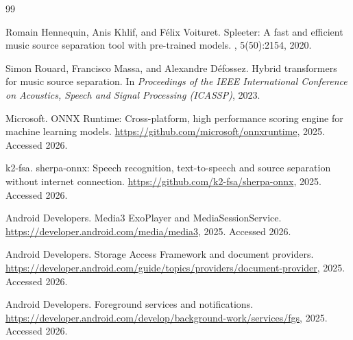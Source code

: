 \documentclass[letterpaper]{article} %
\begin{document}
\begin{thebibliography}{99}

Romain Hennequin, Anis Khlif, and F\'elix Voituret.
\newblock Spleeter: A fast and efficient music source separation tool with
  pre-trained models.
, 5(50):2154, 2020.

Simon Rouard, Francisco Massa, and Alexandre D\'efossez.
\newblock Hybrid transformers for music source separation.
\newblock In {\em Proceedings of the IEEE International Conference on Acoustics,
  Speech and Signal Processing (ICASSP)}, 2023.

Microsoft.
\newblock ONNX Runtime: Cross-platform, high performance scoring engine for
  machine learning models.
\newblock \url{https://github.com/microsoft/onnxruntime}, 2025.
\newblock Accessed 2026.

k2-fsa.
\newblock sherpa-onnx: Speech recognition, text-to-speech and source separation
  without internet connection.
\newblock \url{https://github.com/k2-fsa/sherpa-onnx}, 2025.
\newblock Accessed 2026.

Android Developers.
\newblock Media3 ExoPlayer and MediaSessionService.
\newblock \url{https://developer.android.com/media/media3}, 2025.
\newblock Accessed 2026.

Android Developers.
\newblock Storage Access Framework and document providers.
\newblock \url{https://developer.android.com/guide/topics/providers/document-provider},
  2025.
\newblock Accessed 2026.

Android Developers.
\newblock Foreground services and notifications.
\newblock
  \url{https://developer.android.com/develop/background-work/services/fgs}, 2025.
\newblock Accessed 2026.

\end{thebibliography}
\end{document}
